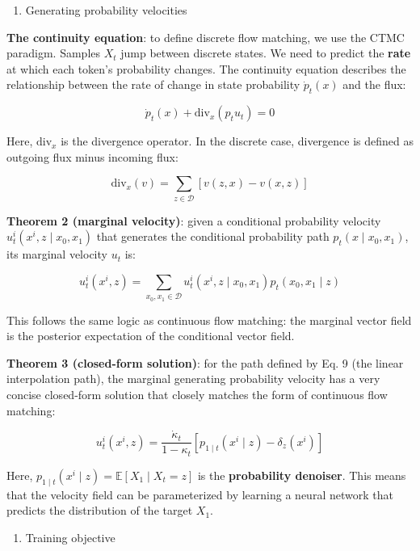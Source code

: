 \begin{enumerate}
\def\labelenumi{\arabic{enumi}.}
\setcounter{enumi}{1}
\tightlist
\item
  Generating probability velocities
\end{enumerate}

\textbf{The continuity equation}: to define discrete flow matching, we use the CTMC paradigm. Samples \(X_t\) jump between discrete states. We need to predict the \textbf{rate} at which each token's probability changes. The continuity equation describes the relationship between the rate of change in state probability \(\dot{p}_t(x)\) and the flux:

\[
\dot{p}_t(x)+\mathrm{div}_x(p_tu_t)=0
\]

Here, \(\mathrm{div}_x\) is the divergence operator. In the discrete case, divergence is defined as outgoing flux minus incoming flux:

\[
\mathrm{div}_x(v)=\sum_{z\in\mathcal{D}}[v(z,x)-v(x,z)]
\]

\textbf{Theorem 2 (marginal velocity)}: given a conditional probability velocity \(u_t^i(x^i,z\mid x_0,x_1)\) that generates the conditional probability path \(p_t(x\mid x_0,x_1)\), its marginal velocity \(u_t\) is:

\[
u_t^i(x^i,z)=\sum_{x_0,x_1\in\mathcal{D}}u_t^i(x^i,z\mid x_0,x_1)p_t(x_0,x_1\mid z)
\]

This follows the same logic as continuous flow matching: the marginal vector field is the posterior expectation of the conditional vector field.

\textbf{Theorem 3 (closed-form solution)}: for the path defined by Eq. 9 (the linear interpolation path), the marginal generating probability velocity has a very concise closed-form solution that closely matches the form of continuous flow matching:

\[
u_t^i(x^i,z)=\frac{\dot{\kappa}_t}{1-\kappa_t}[p_{1\mid t}(x^i\mid z)-\delta_z(x^i)]
\]

Here, \(p_{1\mid t}(x^i\mid z)=\mathbb{E}[X_1\mid X_t=z]\) is the \textbf{probability denoiser}. This means that the velocity field can be parameterized by learning a neural network that predicts the distribution of the target \(X_1\).

\begin{enumerate}
\def\labelenumi{\arabic{enumi}.}
\setcounter{enumi}{2}
\tightlist
\item
  Training objective
\end{enumerate}

